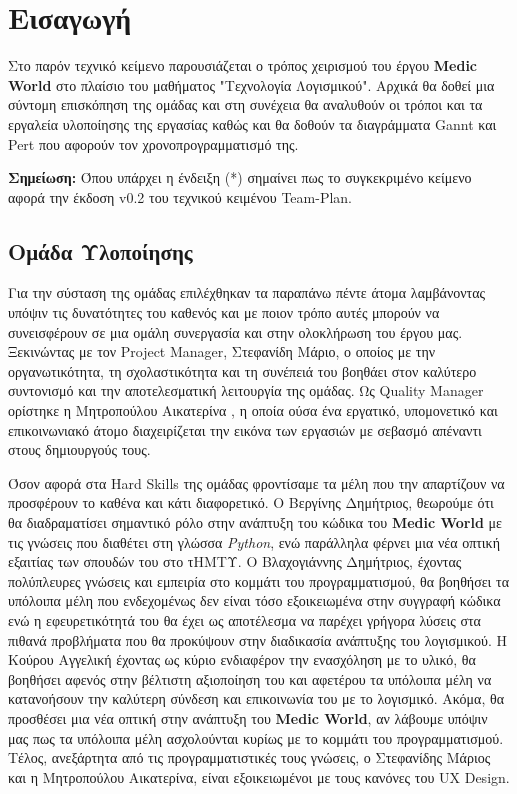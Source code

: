 \documentclass{article}
\begin{document}
{
  \hypersetup{linkcolor=black}
  \tableofcontents
}

\section{Εισαγωγή}
   
Στο παρόν τεχνικό κείμενο παρουσιάζεται ο τρόπος χειρισμού του έργου \textbf{Medic World} στο πλαίσιο του μαθήματος "Τεχνολογία Λογισμικού". Αρχικά θα δοθεί μια σύντομη επισκόπηση της ομάδας και στη συνέχεια θα αναλυθούν οι τρόποι και τα εργαλεία υλοποίησης της εργασίας καθώς και θα δοθούν τα διαγράμματα Gannt και Pert που αφορούν τον χρονοπρογραμματισμό της. 
 
 \textbf{Σημείωση:} Όπου υπάρχει η ένδειξη (*) σημαίνει πως το συγκεκριμένο κείμενο αφορά την έκδοση v0.2 του τεχνικού κειμένου Team-Plan.
 
\subsection{Ομάδα Υλοποίησης}

Για την σύσταση της ομάδας επιλέχθηκαν τα παραπάνω πέντε άτομα λαμβάνοντας υπόψιν τις δυνατότητες του καθενός και με ποιον τρόπο αυτές μπορούν να συνεισφέρουν σε μια ομάλη συνεργασία και στην ολοκλήρωση του έργου μας. Ξεκινώντας με τον Project Manager, Στεφανίδη Μάριο, ο οποίος με την οργανωτικότητα, τη σχολαστικότητα και τη συνέπειά του βοηθάει στον καλύτερο συντονισμό και την αποτελεσματική λειτουργία της ομάδας. Ως Quality Manager ορίστηκε η Μητροπούλου Αικατερίνα , η οποία ούσα ένα εργατικό, υπομονετικό και επικοινωνιακό άτομο διαχειρίζεται την εικόνα των εργασιών με σεβασμό απέναντι στους δημιουργούς τους.
\newline \par

Όσον αφορά στα Hard Skills της ομάδας φροντίσαμε τα μέλη που την απαρτίζουν να προσφέρουν το καθένα και κάτι διαφορετικό. Ο Βεργίνης Δημήτριος, θεωρούμε ότι θα διαδραματίσει σημαντικό ρόλο στην ανάπτυξη του κώδικα του \textbf{Medic World} με τις γνώσεις που διαθέτει στη γλώσσα \emph{Python}, ενώ παράλληλα φέρνει μια νέα οπτική εξαιτίας των σπουδών του στο τΗΜΤΥ. Ο Βλαχογιάννης Δημήτριος, έχοντας πολύπλευρες γνώσεις και εμπειρία στο κομμάτι του προγραμματισμού, θα βοηθήσει τα υπόλοιπα μέλη  που ενδεχομένως δεν είναι τόσο εξοικειωμένα στην συγγραφή κώδικα ενώ η εφευρετικότητά του θα έχει ως αποτέλεσμα να παρέχει γρήγορα λύσεις στα πιθανά προβλήματα που θα προκύψουν στην διαδικασία ανάπτυξης του λογισμικού. Η Κούρου Αγγελική έχοντας ως κύριο ενδιαφέρον την ενασχόληση με το υλικό, θα βοηθήσει αφενός στην βέλτιστη αξιοποίηση του και αφετέρου τα υπόλοιπα μέλη να κατανοήσουν την καλύτερη σύνδεση και επικοινωνία του με το λογισμικό. Ακόμα, θα προσθέσει μια νέα οπτική στην ανάπτυξη του \textbf{Medic World}, αν λάβουμε υπόψιν μας πως τα υπόλοιπα μέλη ασχολούνται κυρίως με το κομμάτι του προγραμματισμού. Τέλος, ανεξάρτητα από τις προγραμματιστικές τους γνώσεις, ο Στεφανίδης Μάριος και η Μητροπούλου Αικατερίνα, είναι εξοικειωμένοι με τους κανόνες του UX Design.
\end{document}
